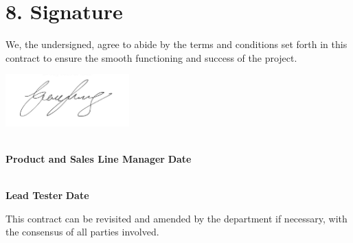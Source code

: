 \documentclass[a4paper,12pt]{article}
\begin{document}
\vspace{1.5em}

\section*{8. Signature}
We, the undersigned, agree to abide by the terms and conditions set forth in this contract to ensure the smooth functioning and success of the project.

\vspace{2em}
\noindent\includegraphics[height=2cm]{namnteckning (1).jpg}

\noindent\underline{\makebox[8cm]{}} \hfill \underline{\makebox[4cm]{}} \\
\textbf{Product and Sales Line Manager} \hfill \textbf{Date}

\vspace{4em}
\noindent\underline{\makebox[8cm]{}} \hfill \underline{\makebox[4cm]{}} \\

\textbf{Lead Tester} \hfill \textbf{Date}

\vspace{2em}
\noindent This contract can be revisited and amended by the department if necessary, with the consensus of all parties involved.
\end{document}
